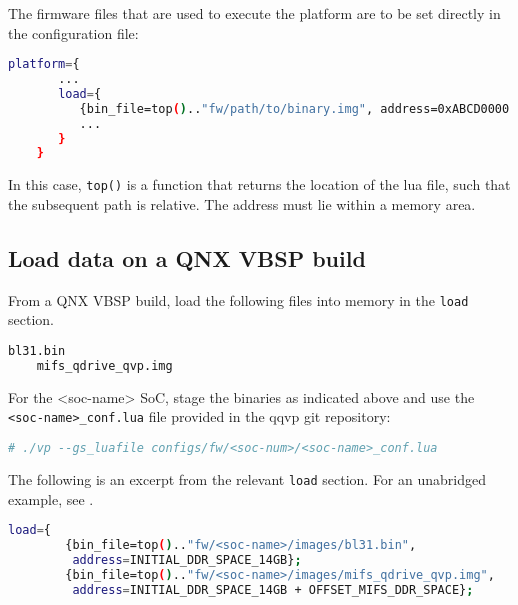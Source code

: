 The firmware files that are used to execute the platform are to be set directly in the configuration file:

\small
\begin{lstlisting}[language=bash]
    platform={
       ...
       load={
          {bin_file=top().."fw/path/to/binary.img", address=0xABCD0000 };
          ...
       }
    }
\end{lstlisting}
\normalsize

In this case, {\small{\lstinline!top()!}} is a function that returns the location of the lua file, such that the subsequent path is relative. The address must lie within a memory area.


\subsection{Load data on a QNX VBSP build}

From a QNX VBSP build, load the following files into memory in the {\small{\lstinline!load!}} section.

\small
\begin{lstlisting}[language=bash]
    bl31.bin
    mifs_qdrive_qvp.img
\end{lstlisting}
\normalsize

For the <soc-name> SoC, stage the binaries as indicated above and use the {\small{\lstinline!<soc-name>_conf.lua!}} file provided in the qqvp git repository:

\small
\begin{lstlisting}[language=bash]
    # ./vp --gs_luafile configs/fw/<soc-num>/<soc-name>_conf.lua
\end{lstlisting}
\normalsize


The following is an excerpt from the relevant {\small{\lstinline!load!}} section. For an unabridged example, see {}.

\small
\begin{lstlisting}[language=bash]
    load={
        {bin_file=top().."fw/<soc-name>/images/bl31.bin",
         address=INITIAL_DDR_SPACE_14GB};
        {bin_file=top().."fw/<soc-name>/images/mifs_qdrive_qvp.img",
         address=INITIAL_DDR_SPACE_14GB + OFFSET_MIFS_DDR_SPACE};
\end{lstlisting}
\normalsize

\clearpage
